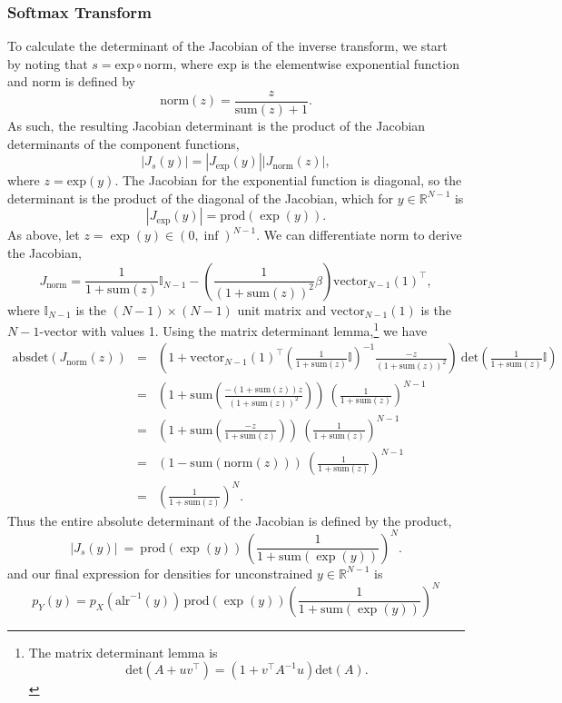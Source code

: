 \documentclass[11pt]{article}
\newcommand{\abs}[1]{\left| #1 \right|}
\newcommand{\absdet}[1]{\abs{#1}}
\begin{document}
\subsubsection{Softmax Transform}

To calculate the determinant of the Jacobian of the inverse transform,
we start by noting that $s = \textrm{exp} \circ \textrm{norm}$, where
$\textrm{exp}$ is the elementwise exponential function and
\textrm{norm} is defined by
\[
  \textrm{norm}(z) = \frac{z}{\textrm{sum}(z) + 1}.
\]
As such, the resulting Jacobian determinant is the product of the
Jacobian determinants of the component functions,
\[
  \absdet{J_s(y)}
  = \absdet{J_{\textrm{exp}}(y)} \absdet{J_{\textrm{norm}}(z)},
\]
where $z = \textrm{exp}(y)$.  The Jacobian for the exponential
function is diagonal, so the determinant is the product of the
diagonal of the Jacobian, which for $y \in \mathbb{R}^{N-1}$ is
\[
  \absdet{J_{\textrm{exp}}(y)} = \textrm{prod}(\exp(y)).
\]
As above, let $z = \exp(y) \in (0, \inf)^{N-1}$.  We can differentiate
$\textrm{norm}$ to derive the Jacobian,
\[
  J_{\textrm{norm}}
  = \frac{1}{1 + \textrm{sum}(z)} \mathbb{I}_{N-1}
  - \left(\frac{1}{(1 + \textrm{sum}(z))^2} \beta \right)
  \textrm{vector}_{N-1}(1)^{\top},
\]
where $\mathbb{I}_{N-1}$ is the $(N - 1) \times (N - 1)$ unit matrix and
$\textrm{vector}_{N-1}(1)$ is the $N - 1$-vector with values 1.  Using
the matrix determinant lemma,\footnote{The matrix determinant lemma
  is \[\textrm{det}(A + u v^{\top}) = (1 + v^{\top} A^{-1} u)
    \textrm{det}(A).\]}
we have
\begin{eqnarray*}
  \textrm{absdet}(J_{\textrm{norm}}(z))
  & = &
  \left(
    1
    + \textrm{vector}_{N-1}(1)^{\top}
    \left(\frac{1}{1 + \textrm{sum}(z)} \mathbb{I} \right)^{-1}
    \frac{-z}{(1 + \textrm{sum}(z))^2}
    \right)
    \ \textrm{det}\left(\frac{1}{1 + \textrm{sum}(z)} \mathbb{I}
        \right)
  \\[6pt]
  & = &
  \left(
    1 
    + \textrm{sum}\left( \frac{-(1 + \textrm{sum}(z)) z}{(1 +
        \textrm{sum}(z))^2} \right)
  \right)
        \ \left( \frac{1}{1 + \textrm{sum}(z)} \right)^{N-1}
  \\[6pt]
  & = &
        \left(1 + \textrm{sum}\left(\frac{-z}{1 + \textrm{sum}(z)} \right)\right)        
        \ \left( \frac{1}{1 + \textrm{sum}(z)} \right)^{N-1}
  \\[6pt]
  & = & \left( 1 - \textrm{sum}(\textrm{norm}(z)) \right) 
        \ \left( \frac{1}{1 + \textrm{sum}(z)} \right)^{N-1}
  \\[6pt]
  & = & \left( \frac{1}{1 + \textrm{sum}(z)} \right)^N.
\end{eqnarray*}
Thus the entire absolute determinant of the Jacobian is defined by the
product, 
\[
  \absdet{J_s(y)}
  \ = \
  \textrm{prod}(\exp(y))
  \, \left( \frac{1}{1 + \textrm{sum}(\exp(y))} \right)^N.
\]
and our final expression for densities for unconstrained $y \in
\mathbb{R}^{N-1}$ is
\[
  p_Y(y)
  = p_X(\textrm{alr}^{-1}(y))
  \, \textrm{prod}(\exp(y))
  \left( \frac{1}{1 + \textrm{sum}(\exp(y))} \right)^N
\]  
\end{document}
